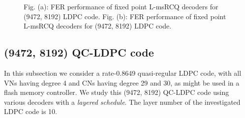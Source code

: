 \documentclass [PhD] {uclathes}
\begin{document}
\begin{figure}[t] 
    \centering
    \hfill
  \caption{Fig. (a): FER performance of fixed point L-msRCQ decoders for (9472, 8192) LDPC code.  Fig.  (b): FER performance of fixed point L-msRCQ decoders for (9472, 8192) LDPC code. } \label{fig: 8k_performance}
\end{figure}

\subsection{(9472, 8192) QC-LDPC code}
In this subsection we consider a rate-0.8649 quasi-regular LDPC code, with all VNs having degree 4 and CNs having degree 29 and 30, as might be used in a flash memory controller. We study this (9472, 8192) QC-LDPC code using various decoders with a \textit{layered schedule}. The layer number of the investigated LDPC code is 10.  
\end{document}
